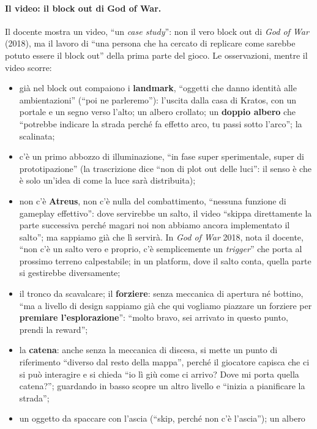 \paragraph{Il video: il block out di God of War.} Il docente mostra un video, ``un
\emph{case study}'': non il vero block out di \emph{God of War} (2018), ma il lavoro di
``una persona che ha cercato di replicare come sarebbe potuto essere il block out'' della
prima parte del gioco. Le osservazioni, mentre il video scorre:
\begin{itemize}
  \item già nel block out compaiono i \textbf{landmark}, ``oggetti che danno identità alle
        ambientazioni'' (``poi ne parleremo''): l'uscita dalla casa di Kratos, con un
        portale e un segno verso l'alto; un albero crollato; un \textbf{doppio albero} che
        ``potrebbe indicare la strada perché fa effetto arco, tu passi sotto l'arco''; la
        scalinata;
  \item c'è un primo abbozzo di illuminazione, ``in fase super sperimentale, super di
        prototipazione'' (la trascrizione dice ``non di plot out delle luci'': il senso è
        che è solo un'idea di come la luce sarà distribuita);
  \item non c'è \textbf{Atreus}, non c'è nulla del combattimento, ``nessuna funzione di
        gameplay effettivo'': dove servirebbe un salto, il video ``skippa direttamente la
        parte successiva perché magari noi non abbiamo ancora implementato il salto'';
        ma sappiamo già che lì servirà. In \emph{God of War} 2018, nota il docente, ``non
        c'è un salto vero e proprio, c'è semplicemente un \emph{trigger}'' che porta al
        prossimo terreno calpestabile; in un platform, dove il salto conta, quella parte
        si gestirebbe diversamente;
  \item il tronco da scavalcare; il \textbf{forziere}: senza meccanica di apertura né
        bottino, ``ma a livello di design sappiamo già che qui vogliamo piazzare un
        forziere per \textbf{premiare l'esplorazione}'': ``molto bravo, sei arrivato in
        questo punto, prendi la reward'';
  \item la \textbf{catena}: anche senza la meccanica di discesa, si mette un punto di
        riferimento ``diverso dal resto della mappa'', perché il giocatore capisca che ci si
        può interagire e si chieda ``io lì giù come ci arrivo? Dove mi porta quella
        catena?''; guardando in basso scopre un altro livello e ``inizia a pianificare la
        strada'';
  \item un oggetto da spaccare con l'ascia (``skip, perché non c'è l'ascia''); un albero

\end{itemize}
